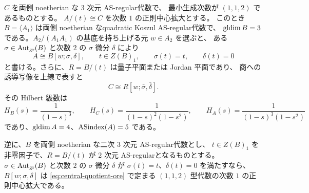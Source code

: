 \begin{theorem}\label{thm:central-ore}
$C$ を両側 noetherian な $3$ 次元 AS-regular代数で、
最小生成次数が $(1,1,2)$ であるものとする。
$A/(t)\cong C$ を次数 $1$ の正則中心拡大とする。
このとき $B=\langle A_1\rangle$ は両側 noetherian なquadratic Koszul AS-regular代数で、
$\operatorname{gldim} B=3$ である。$A_2/(A_1A_1)$ の基底を持ち上げる元 $w\in A_2$ を選ぶと、
ある $\sigma\in\operatorname{Aut}_{\mathrm{gr}}(B)$ と次数 $2$ の $\sigma$ 微分 $\delta$ により
\begin{equation}\label{eq:central-ore}
 A\cong B[w;\sigma,\delta],\qquad
 t\in Z(B)_1,\qquad \sigma(t)=t,\qquad\delta(t)=0
\end{equation}
と書ける。さらに、$R=B/(t)$ は量子平面または Jordan 平面であり、
商への誘導写像を上線で表すと
\begin{equation}\label{eq:central-quotient-ore}
 C\cong R[w;\bar\sigma,\bar\delta].
\end{equation}
その Hilbert 級数は
\[
 H_B(s)=\frac1{(1-s)^3},\qquad
 H_C(s)=\frac1{(1-s)^2(1-s^2)},\qquad
 H_A(s)=\frac1{(1-s)^3(1-s^2)}
\]
であり、$\operatorname{gldim} A=4$、$\operatorname{ASindex}(A)=5$ である。

逆に、$B$ を両側 noetherian な二次 $3$ 次元 AS-regular代数とし、
$t\in Z(B)_1$ を非零因子で、$R=B/(t)$ が $2$ 次元 AS-regularとなるものとする。
$\sigma\in\operatorname{Aut}_{\mathrm{gr}}(B)$ と次数 $2$ の $\sigma$ 微分 $\delta$ が
$\sigma(t)=t$、$\delta(t)=0$ を満たすなら、$B[w;\sigma,\delta]$ は
\eqref{eq:central-quotient-ore} で定まる $(1,1,2)$ 型代数の次数 $1$ の正則中心拡大である。
\end{theorem}

